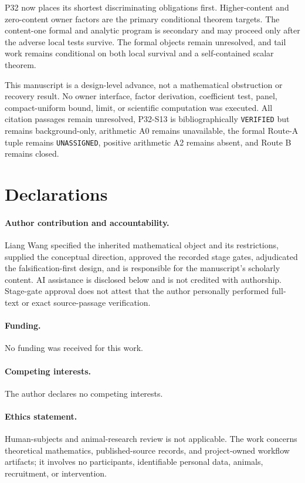 \documentclass[11pt]{article}
\begin{document}
P32 now places its shortest discriminating obligations first.
Higher-content and zero-content owner factors are the primary
conditional theorem targets. The content-one formal and analytic program
is secondary and may proceed only after the adverse local tests survive.
The formal objects remain unresolved, and tail work remains conditional
on both local survival and a self-contained scalar theorem.

This manuscript is a design-level advance, not a mathematical obstruction
or recovery result. No owner interface, factor derivation, coefficient
test, panel, compact-uniform bound, limit, or scientific computation was
executed. All citation passages remain unresolved, P32-S13 is
bibliographically \texttt{VERIFIED} but remains background-only, arithmetic A0 remains
unavailable, the formal Route-A tuple remains \texttt{UNASSIGNED},
positive arithmetic A2 remains absent, and Route B remains closed.

\section*{Declarations}

\paragraph{Author contribution and accountability.}
Liang Wang specified the inherited mathematical object and its
restrictions, supplied the conceptual direction, approved the recorded
stage gates, adjudicated the falsification-first design, and is
responsible for the manuscript's scholarly content. AI assistance is
disclosed below and is not credited with authorship. Stage-gate approval
does not attest that the author personally performed full-text or exact
source-passage verification.

\paragraph{Funding.} No funding was received for this work.

\paragraph{Competing interests.} The author declares no competing
interests.

\paragraph{Ethics statement.} Human-subjects and animal-research review
is not applicable. The work concerns theoretical mathematics,
published-source records, and project-owned workflow artifacts; it
involves no participants, identifiable personal data, animals,
recruitment, or intervention.
\end{document}

